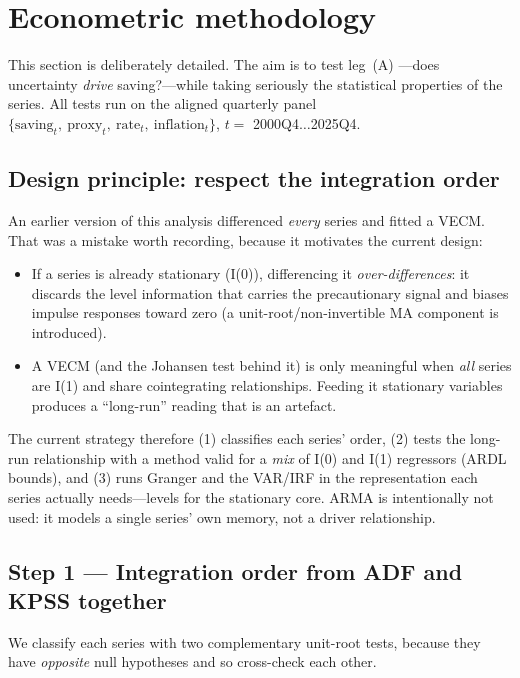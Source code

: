 \documentclass[11pt,a4paper]{article}
\begin{document}
\section{Econometric methodology}\label{sec:econ}

This section is deliberately detailed. The aim is to test leg~(A)
---does uncertainty \emph{drive} saving?---while taking seriously the statistical
properties of the series. All tests run on the aligned quarterly panel
$\{\text{saving}_t,\ \text{proxy}_t,\ \text{rate}_t,\ \text{inflation}_t\}$,
$t=$ 2000Q4$\ldots$2025Q4.

\subsection{Design principle: respect the integration order}
An earlier version of this analysis differenced \emph{every} series and fitted a
VECM. That was a mistake worth recording, because it motivates the current
design:
\begin{itemize}
  \item If a series is already stationary (I(0)), differencing it
  \emph{over-differences}: it discards the level information that carries the
  precautionary signal and biases impulse responses toward zero (a
  unit-root/non-invertible MA component is introduced).
  \item A VECM (and the Johansen test behind it) is only meaningful when
  \emph{all} series are I(1) and share cointegrating relationships. Feeding it
  stationary variables produces a ``long-run'' reading that is an artefact.
\end{itemize}
The current strategy therefore (1) classifies each series' order, (2) tests the
long-run relationship with a method valid for a \emph{mix} of I(0) and I(1)
regressors (ARDL bounds), and (3) runs Granger and the VAR/IRF in the
representation each series actually needs---levels for the stationary core. ARMA
is intentionally not used: it models a single series' own memory, not a
driver relationship.

\subsection{Step 1 --- Integration order from ADF and KPSS together}
We classify each series with two complementary unit-root tests, because they
have \emph{opposite} null hypotheses and so cross-check each other.
\end{document}
